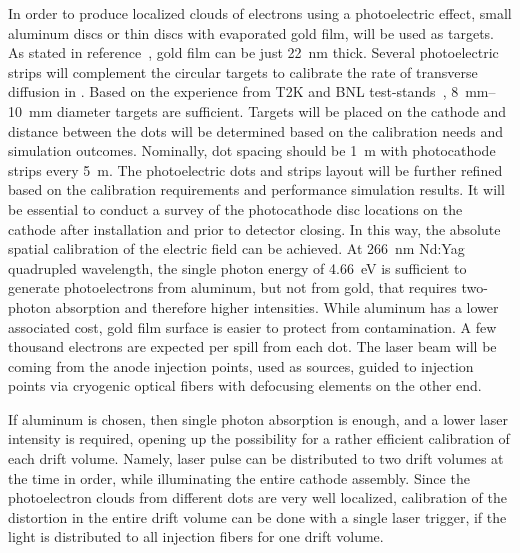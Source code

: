 In order to produce localized clouds of electrons using a photoelectric effect, small aluminum discs or thin discs with evaporated gold film, will be used as targets. As stated in reference~\cite{Li:2016ods}, gold film can be just \SI{22}{\nano\m} thick. Several photoelectric strips will complement the circular targets to calibrate the rate of transverse diffusion in . Based on the experience from T2K and BNL  test-stands~\cite{Li:2016ods}, \SIrange{8}{10}{\milli\m} diameter targets are sufficient. Targets will be placed on the cathode and distance between the dots will be determined based on the calibration needs and simulation outcomes. Nominally, dot spacing should be \SI{1}{\m} with photocathode strips every \SI{5}{\m}. The photoelectric dots and strips layout will be further refined based on the calibration requirements and performance simulation results. It will be essential to conduct a survey of the photocathode disc locations on the cathode  after installation and prior to detector closing. In this way, the absolute spatial calibration of the electric field can be achieved. 
At \SI{266}{\nano\m} Nd:Yag quadrupled wavelength, the single photon energy of \SI{4.66}{\eV} is sufficient to generate photoelectrons from aluminum, but not from gold, that requires two-photon absorption and therefore higher intensities.
While aluminum has a lower associated cost, gold film surface is easier to protect from contamination. 
A few thousand electrons are expected per spill from each dot. The laser beam will be coming from the anode injection points, used as sources, guided to injection points via cryogenic optical fibers with defocusing elements on the other end. 

If aluminum is chosen, then single photon absorption is enough, and a lower laser intensity is required, opening up the 
possibility for a rather efficient calibration of each drift volume. Namely, laser pulse can be distributed to two drift volumes at the time in order, while illuminating the entire cathode assembly. Since the photoelectron clouds from different dots are very well localized, calibration of the \efield distortion in the entire drift volume can be done with a single laser trigger, if the light is distributed to all injection fibers for one drift volume. 

